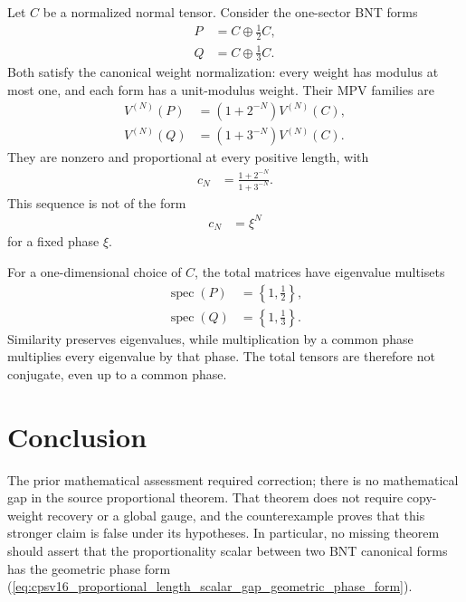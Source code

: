 \documentclass{article}
\begin{document}
Let $C$ be a normalized normal tensor. Consider the one-sector BNT forms
\begin{align}
    P
        &=C\oplus\tfrac12C,
    \label{eq:cpsv16_proportional_length_scalar_gap_counterexample_p}\\
    Q
        &=C\oplus\tfrac13C.
    \label{eq:cpsv16_proportional_length_scalar_gap_counterexample_q}
\end{align}
Both satisfy the canonical weight normalization: every weight has modulus at
most one, and each form has a unit-modulus weight. Their MPV families are
\begin{align}
    V^{(N)}(P)
        &=(1+2^{-N})V^{(N)}(C),
    \label{eq:cpsv16_proportional_length_scalar_gap_counterexample_p_mpv}\\
    V^{(N)}(Q)
        &=(1+3^{-N})V^{(N)}(C).
    \label{eq:cpsv16_proportional_length_scalar_gap_counterexample_q_mpv}
\end{align}
They are nonzero and proportional at every positive length, with
\begin{align}
    c_N
        &=\frac{1+2^{-N}}{1+3^{-N}}.
    \label{eq:cpsv16_proportional_length_scalar_gap_counterexample_scalar}
\end{align}
This sequence is not of the form
\begin{align}
    c_N
        &=\xi^N
    \label{eq:cpsv16_proportional_length_scalar_gap_geometric_phase_form}
\end{align}
for a fixed phase $\xi$.

For a one-dimensional choice of $C$, the total matrices have eigenvalue
multisets
\begin{align}
    \operatorname{spec}(P)
        &=\left\{1,\tfrac12\right\},
    \label{eq:cpsv16_proportional_length_scalar_gap_p_spectrum}\\
    \operatorname{spec}(Q)
        &=\left\{1,\tfrac13\right\}.
    \label{eq:cpsv16_proportional_length_scalar_gap_q_spectrum}
\end{align}
Similarity preserves eigenvalues, while multiplication by a common phase
multiplies every eigenvalue by that phase. The total tensors are therefore not
conjugate, even up to a common phase.

\section{Conclusion}

The prior mathematical assessment required correction; there is no
mathematical gap in the source proportional theorem. That theorem does not
require copy-weight recovery or a global gauge, and the counterexample proves
that this stronger claim is false under its hypotheses. In particular, no
missing theorem should assert that the proportionality scalar between two BNT
canonical forms has the geometric phase form
(\ref{eq:cpsv16_proportional_length_scalar_gap_geometric_phase_form}).
\end{document}
